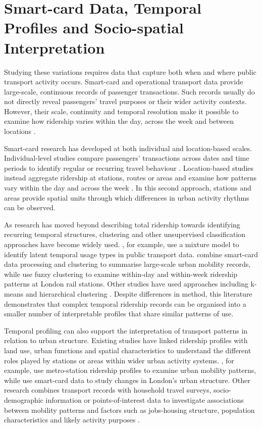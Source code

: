 \section{Smart-card Data, Temporal Profiles and Socio-spatial Interpretation}

Studying these variations requires data that capture both when and where public transport activity occurs. Smart-card and operational transport data provide large-scale, continuous records of passenger transactions. Such records usually do not directly reveal passengers' travel purposes or their wider activity contexts. However, their scale, continuity and temporal resolution make it possible to examine how ridership varies within the day, across the week and between locations \citep{Zhong2016,Manley2018,Cats2024}.

Smart-card research has developed at both individual and location-based scales. Individual-level studies compare passengers' transactions across dates and time periods to identify regular or recurring travel behaviour \citep{Zhong2016,Manley2018}. Location-based studies instead aggregate ridership at stations, routes or areas and examine how patterns vary within the day and across the week \citep{Gan2020,Zhang2021,Cheng2024}. In this second approach, stations and areas provide spatial units through which differences in urban activity rhythms can be observed.

As research has moved beyond describing total ridership towards identifying recurring temporal structures, clustering and other unsupervised classification approaches have become widely used. \citet{Briand2016}, for example, use a mixture model to identify latent temporal usage types in public transport data. \citet{ElMahrsi2017} combine smart-card data processing and clustering to summarise large-scale urban mobility records, while \citet{Cheng2024} use fuzzy clustering to examine within-day and within-week ridership patterns at London rail stations. Other studies have used approaches including k-means and hierarchical clustering \citep{Zhao2020}. Despite differences in method, this literature demonstrates that complex temporal ridership records can be organised into a smaller number of interpretable profiles that share similar patterns of use.

Temporal profiling can also support the interpretation of transport patterns in relation to urban structure. Existing studies have linked ridership profiles with land use, urban functions and spatial characteristics to understand the different roles played by stations or areas within wider urban activity systems. \citet{Gan2020}, for example, use metro-station ridership profiles to examine urban mobility patterns, while \citet{Zhang2021} use smart-card data to study changes in London's urban structure. Other research combines transport records with household travel surveys, socio-demographic information or points-of-interest data to investigate associations between mobility patterns and factors such as jobs-housing structure, population characteristics and likely activity purposes \citep{Long2015,Zhang2019,SariAslam2021,Yang2023}.

